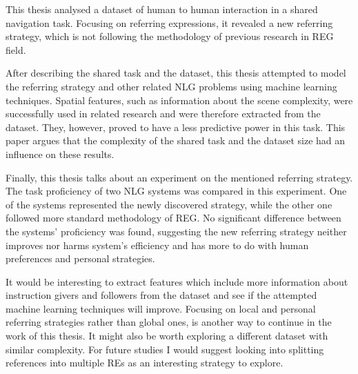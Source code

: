 This thesis analysed a dataset of human to human interaction in a shared navigation task. Focusing on referring expressions, it revealed a new referring strategy, which is not following the methodology of previous research in REG field. 

After describing the shared task and the dataset, this thesis attempted to model the referring strategy and other related NLG problems using machine learning techniques. Spatial features, such as information about the scene complexity, were successfully used in related research and were therefore extracted from the dataset. They, however, proved to have a less predictive power in this task. This paper argues that the complexity of the shared task and the dataset size had an influence on these results.

Finally, this thesis talks about an experiment on the mentioned referring strategy. The task proficiency of two NLG systems was compared in this experiment. One of the systems represented the newly discovered strategy, while the other one followed more standard methodology of REG. No significant difference between the systems' proficiency was found, suggesting the new referring strategy neither improves nor harms system's efficiency and has more to do with human preferences and personal strategies.

It would be interesting to extract features which include more information about instruction givers and followers from the dataset and see if the attempted machine learning techniques will improve. Focusing on local and personal referring strategies rather than global ones, is another way to continue in the work of this thesis. It might also be worth exploring a different dataset with similar complexity. For future studies I would suggest looking into splitting references into multiple REs as an interesting strategy to explore.

